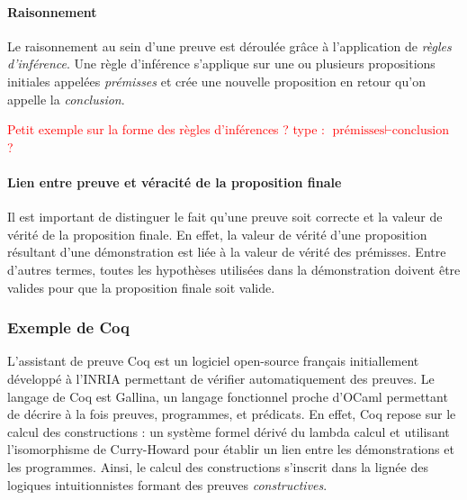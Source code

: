 			\paragraph{Raisonnement}
			Le raisonnement au sein d'une preuve est déroulée grâce à l'application de \emph{règles d'inférence}. Une règle d'inférence s'applique sur une ou plusieurs propositions initiales appelées \emph{prémisses} et crée une nouvelle proposition en retour qu'on appelle la \emph{conclusion}.

			\textcolor{red}{Petit exemple sur la forme des règles d'inférences ? type : $ \text{prémisses} \vdash \text{conclusion}$ ?}

			\paragraph{Lien entre preuve et véracité de la proposition finale} Il est important de distinguer le fait qu'une preuve soit correcte et la valeur de vérité de la proposition finale. En effet, la valeur de vérité d'une proposition résultant d'une démonstration est liée à la valeur de vérité des prémisses. Entre d'autres termes, toutes les hypothèses utilisées dans la démonstration doivent être valides pour que la proposition finale soit valide.

			\subsubsection{Exemple de Coq}
			L'assistant de preuve Coq est un logiciel open-source français initiallement développé à l'INRIA permettant de vérifier automatiquement des preuves. Le langage de Coq est Gallina, un langage fonctionnel proche d'OCaml permettant de décrire à la fois preuves, programmes, et prédicats. En effet, Coq repose sur le calcul des constructions : un système formel dérivé du lambda calcul et utilisant l'isomorphisme de Curry-Howard pour établir un lien entre les démonstrations et les programmes. Ainsi, le calcul des constructions s'inscrit dans la lignée des logiques intuitionnistes formant des preuves \emph{constructives}. 

